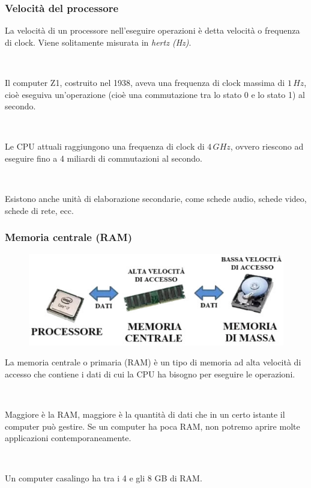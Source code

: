 \documentclass[handout]{beamer}
\begin{document}
\begin{frame}
\frametitle{Velocità del processore}
La velocità di un processore nell'eseguire operazioni è detta \alert<1>{velocità o frequenza di clock}. Viene solitamente misurata in \emph{hertz (Hz)}.\pause

~

Il computer Z1, costruito nel 1938, aveva una frequenza di clock massima di $ 1 \, Hz $, cioè eseguiva un'operazione (cioè una commutazione tra lo stato 0 e lo stato 1) al secondo.\pause

~

Le CPU attuali raggiungono una frequenza di clock di $ 4 \, GHz $, ovvero riescono ad eseguire fino a \alert<3>{4 miliardi di commutazioni al secondo}.\pause

~

Esistono anche \alert<4>{unità di elaborazione secondarie}, come schede audio, schede video, schede di rete, ecc.
\end{frame}


\begin{frame}
\frametitle{Memoria centrale (RAM)}
\begin{figure}
  \includegraphics[width=.5\columnwidth]{img/memorie.jpg}
\end{figure}
La memoria centrale o primaria (RAM) è un tipo di \alert<1>{memoria ad alta velocità di accesso} che contiene i dati di cui la CPU ha bisogno per eseguire le operazioni.\pause

~

\alert<2>{Maggiore è la RAM, maggiore è la quantità di dati che in un certo istante il computer può gestire.} Se un computer ha poca RAM, non potremo aprire molte applicazioni contemporaneamente.\pause

~

Un computer casalingo ha tra i 4 e gli 8 GB di RAM.
\end{frame}
\end{document}

